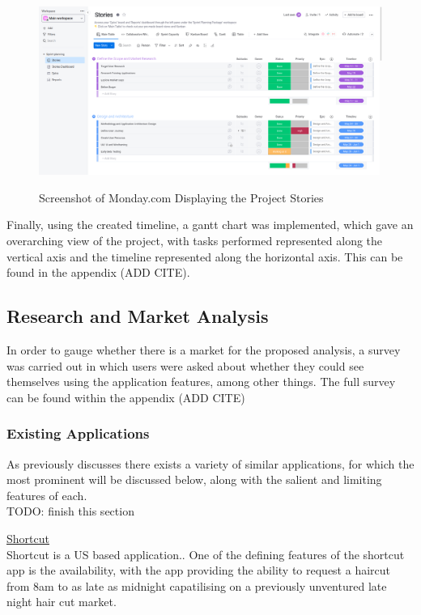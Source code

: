 \documentclass[12pt]{article}
\begin{document}
	\begin{figure}[H]
		\centering
		\includegraphics[scale=0.25]{images/monday.png}
		\caption{Screenshot of Monday.com Displaying the Project Stories}
		\label{fig:monday.com}
		\cite{MondayHome2021}
	\end{figure}

	Finally, using the created timeline, a gantt chart was implemented, which gave an overarching view of the project, with tasks performed represented along the vertical axis and the timeline represented along the horizontal axis. This can be found in the appendix (ADD CITE).
	
	\subsection{Research and Market Analysis}
	\label{market-analysis}
	In order to gauge whether there is a market for the proposed analysis, a survey was carried out in which users were asked about whether they could see themselves using the application features, among other things. The full survey can be found within the appendix (ADD CITE)
	
	\subsubsection{Existing Applications}
	As previously discusses there exists a variety of similar applications, for which the most prominent will be discussed below, along with the salient and limiting features of each.
	\\
	TODO: finish this section
	
	\noindent
	\underline{Shortcut}
	\\
	Shortcut is a US based application..
	One of the defining features of the shortcut app is the availability, with the app providing the ability to request a haircut from 8am to as late as midnight capatilising on a previously unventured late night hair cut market.
	
\end{document}
